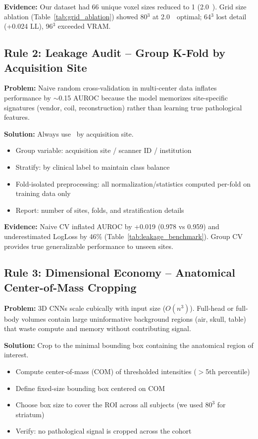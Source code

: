 \textbf{Evidence:} Our dataset had 66 unique voxel sizes reduced to 1 (2.0~\voxelunit). Grid size ablation (Table~\ref{tab:grid_ablation}) showed 80$^3$ at 2.0~\voxelunit~optimal; 64$^3$ lost detail (+0.024 LL), 96$^3$ exceeded VRAM.

\subsection{Rule 2: Leakage Audit -- Group K-Fold by Acquisition Site}
\label{rule:leakage}

\textbf{Problem:} Naive random cross-validation in multi-center data inflates performance by $\sim$0.15 AUROC because the model memorizes site-specific signatures (vendor, coil, reconstruction) rather than learning true pathological features.

\textbf{Solution:} Always use \cvname~by acquisition site.
\begin{itemize}
    \item Group variable: acquisition site / scanner ID / institution
    \item Stratify: by clinical label to maintain class balance
    \item Fold-isolated preprocessing: all normalization/statistics computed per-fold on training data only
    \item Report: number of sites, folds, and stratification details
\end{itemize}

\textbf{Evidence:} Naive CV inflated AUROC by +0.019 (0.978 vs 0.959) and underestimated LogLoss by 46\% (Table~\ref{tab:leakage_benchmark}). Group CV provides true generalizable performance to unseen sites.

\subsection{Rule 3: Dimensional Economy -- Anatomical Center-of-Mass Cropping}
\label{rule:dimension}

\textbf{Problem:} 3D CNNs scale cubically with input size ($O(n^3)$). Full-head or full-body volumes contain large uninformative background regions (air, skull, table) that waste compute and memory without contributing signal.

\textbf{Solution:} Crop to the minimal bounding box containing the anatomical region of interest.
\begin{itemize}
    \item Compute center-of-mass (COM) of thresholded intensities ($>$5th percentile)
    \item Define fixed-size bounding box centered on COM
    \item Choose box size to cover the ROI across all subjects (we used $80^3$ for striatum)
    \item Verify: no pathological signal is cropped across the cohort
\end{itemize}

